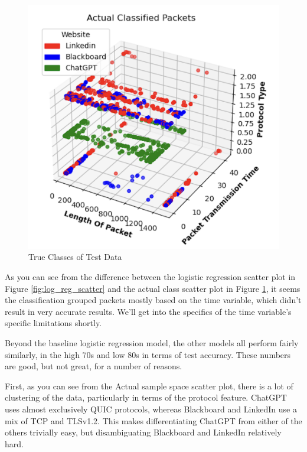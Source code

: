 \documentclass[10pt,sigconf,letterpaper,nonacm]{acmart}
\begin{document}
\begin{figure}
    \centering
    \includegraphics[width=1\linewidth]{Figures_and_Graphs/ActualClassifiedPacketsScatterpng.png}
    \caption{True Classes of Test Data}
    \label{fig:actual_scatter}
\end{figure}

As you can see from the difference between the logistic regression scatter plot in Figure \ref{fig:log_reg_scatter} and the actual class scatter plot in Figure \ref{fig:actual_scatter}, it seems the classification grouped packets mostly based on the time variable, which didn't result in very accurate results. We'll get into the specifics of the time variable's specific limitations shortly.

Beyond the baseline logistic regression model, the other models all perform fairly similarly, in the high 70s and low 80s in terms of test accuracy.
These numbers are good, but not great, for a number of reasons.

First, as you can see from the Actual sample space scatter plot, there is a lot of clustering of the data, particularly in terms of the protocol feature. ChatGPT uses almost exclusively QUIC protocols, whereas Blackboard and LinkedIn use a mix of TCP and TLSv1.2. This makes differentiating ChatGPT from either of the others trivially easy, but disambiguating Blackboard and LinkedIn relatively hard.
\end{document}
